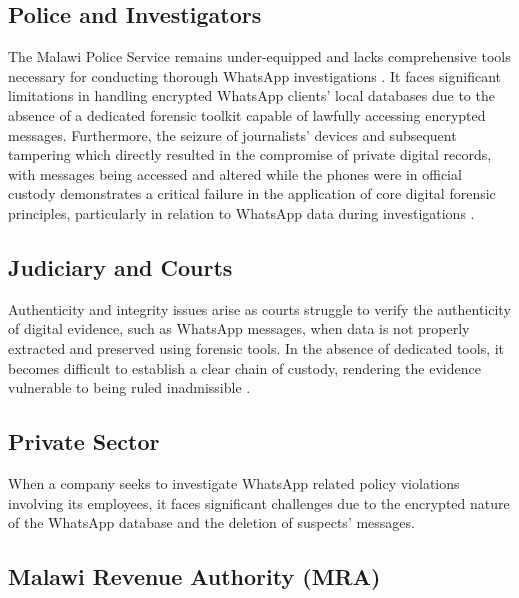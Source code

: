 \documentclass[12pt,a4paper]{report}
\begin{document}
\subsection{Police and Investigators}

The Malawi Police Service remains under-equipped and lacks comprehensive tools necessary for conducting thorough WhatsApp investigations \citep{chimoyo2024}. It faces significant limitations in handling encrypted WhatsApp clients' local databases due to the absence of a dedicated forensic toolkit capable of lawfully accessing encrypted messages. Furthermore, the seizure of journalists' devices and subsequent tampering which directly resulted in the compromise of private digital records, with messages being accessed and altered while the phones were in official custody demonstrates a critical failure in the application of core digital forensic principles, particularly in relation to WhatsApp data during investigations \citep{cpj2024}.

\subsection{Judiciary and Courts}

Authenticity and integrity issues arise as courts struggle to verify the authenticity of digital evidence, such as WhatsApp messages, when data is not properly extracted and preserved using forensic tools. In the absence of dedicated tools, it becomes difficult to establish a clear chain of custody, rendering the evidence vulnerable to being ruled inadmissible \citep{rapozoND}.

\subsection{Private Sector}

When a company seeks to investigate WhatsApp related policy violations involving its employees, it faces significant challenges due to the encrypted nature of the WhatsApp database and the deletion of suspects' messages.

\subsection{Malawi Revenue Authority (MRA)}
\end{document}
